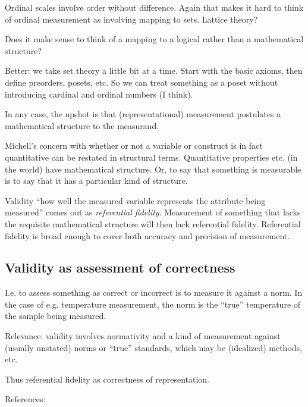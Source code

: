 \documentclass[11pt,twoside]{article}
\begin{document}
Ordinal scales involve order without difference.  Again that makes it
hard to think of ordinal measurement as involving mapping to sets.
Lattice theory?

Does it make sense to think of a mapping to a logical rather than a
mathematical structure?

Better: we take set theory a little bit at a time.  Start with the
basic axioms, then define preorders, posets, etc.  So we can treat
something as a poset without introducing cardinal and ordinal numbers
(I think).

In any case, the upshot is that (representational) measurement
postulates a mathematical structure to the measurand.

Michell's concern with whether or not a variable or construct is in
fact quantitative can be restated in structural terms.  Quantitative
properties etc. (in the world) have mathematical structure.  Or, to
say that something is measurable is to say that it has a particular
kind of structure.

Validity ``how well the measured variable represents the attribute
being measured'' comes out as \textit{referential fidelity}.  Measurement
of something that lacks the requisite mathematical structure will then
lack referential fidelity.  Referential fidelity is broad enough to
cover both accuracy and precision of measurement.

\subsection{Validity as assessment of correctness}

I.e. to assess something as correct or incorrect is to measure it
against a norm.  In the case of e.g. temperature measurement, the norm
is the ``true'' temperature of the sample being measured.

Relevance: validity involves normativity and a kind of measurement
against (usually unstated) norms or ``true'' standards, which may be
(idealized) methods, etc.

Thus referential fidelity as correctness of representation.

\noindent References:

\noindent
\cite{chang_inventing_2004} \\
\cite{chang_measurement_2004} \\
\cite{chang_spirit_2004} \\
\cite{martin_counting_2009} \\
\cite{michell_normal_2000}\\
\cite{sherry_thermoscopes_2011}
\end{document}
